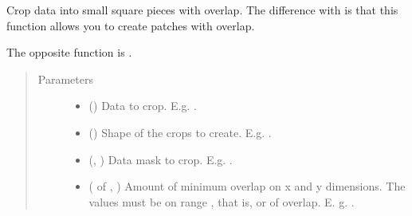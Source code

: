 \documentclass[letterpaper,10pt,english]{sphinxmanual}
\begin{document}

\begin{fulllineitems}
\label{\detokenize{data/data_2d_manipulation:data.data_2D_manipulation.crop_data_with_overlap}}
Crop data into small square pieces with overlap. The difference with  is that this function
allows you to create patches with overlap.

The opposite function is {\hyperref[\detokenize{data/data_2d_manipulation:data.data_2D_manipulation.merge_data_with_overlap}]{}}.
\begin{quote}\begin{description}
\item[{Parameters}] \leavevmode\begin{itemize}
\item {} 
 () \textendash{} Data to crop. E.g. .

\item {} 
 () \textendash{} Shape of the crops to create. E.g. .

\item {} 
 (, ) \textendash{} Data mask to crop. E.g. .

\item {} 
 ( of , ) \textendash{} Amount of minimum overlap on x and y dimensions. The values must be on range \sphinxcode{\sphinxupquote{{[}0, 1)}}, that is,  or
 of overlap. E. g. .


\end{itemize}
\end{description}
\end{quote}
\end{fulllineitems}
\end{document}
